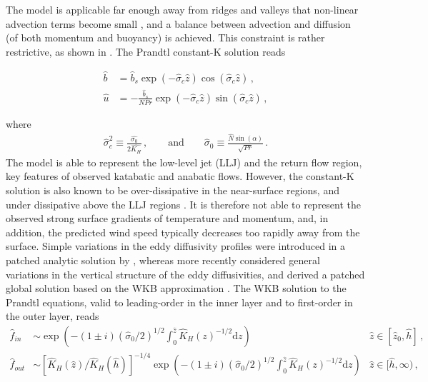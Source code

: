 The model is applicable far enough away from ridges and valleys that non-linear advection terms become small \citep{NAPPO1987}, and a balance between advection and diffusion (of both momentum and buoyancy) is achieved. This constraint is rather restrictive, as shown in \citet{Zardi2015}. 
The Prandtl constant-K solution reads 
%
\begin{linenomath*}
\begin{subequations}
	\label{Prandtl_sol}
	\begin{align}
		\hat{b} & = \hat{b}_s \exp{(-\hat{\sigma}_c \hat{z})} \cos{(\hat{\sigma}_c \hat{z})} \, , \\
		\hat{u} & = -\frac{\hat{b}_s}{N Pr} \exp{(-\hat{\sigma}_c \hat{z})} \sin{(\hat{\sigma}_c \hat{z})} \, ,
	\end{align}
\end{subequations}
\end{linenomath*}
%
where
%
\begin{eqnarray}
	\hat{\sigma}_c^2 \equiv \frac{\hat{\sigma_0}}{2\hat{K_H}} \, , \qquad \mathrm{and} \qquad
	\hat{\sigma}_0 \equiv \frac{\hat{N} \sin{(\alpha)}}{\sqrt{Pr}} \, .
\end{eqnarray}
%
The model is able to represent the low-level jet (LLJ) and the return flow region, key features of observed katabatic and anabatic flows. 
However, the constant-K solution is also known to be over-dissipative in the near-surface regions, and under dissipative above the LLJ regions \citep{Defant1949,Oerlemans1998, grisogono2001katabatic}. It is therefore not able to represent the observed strong surface gradients of temperature and momentum, and, in addition, the predicted wind speed typically decreases too rapidly away from the surface.
Simple variations in the eddy diffusivity profiles were introduced in a patched analytic solution by \citet{gutman_1983}, whereas more recently \citet{grisogono2001katabatic} considered general variations in the vertical structure of the eddy diffusivities, and derived  a patched global solution based on the WKB approximation \citep{Bender1979}.
The WKB solution to the Prandtl equations, valid to leading-order in the inner layer and to first-order in the outer layer, reads
%
\begin{subequations}
	\begin{align}
		\hat{f}_{in} & \sim  \exp{ \left( -(1 \pm i) (\hat{\sigma}_0/2)^{1/2} \int_0^{\hat{z}}{\hat{K}_H(z)^{-1/2}}{\mathrm{d}z}\right)}  &  \hat{z} \in [\hat{z}_0,\hat{h}] \, , \\
		\hat{f}_{out}&  \sim  [ \hat{K}_H(\hat{z}) / \hat{K}_H(\hat{h}) ]^{-1/4} \exp{ \left( -(1 \pm i) (\hat{\sigma}_0/2)^{1/2} \int_0^{\hat{z}}{\hat{K}_H(z)^{-1/2}}{\mathrm{d}z} \right)} & \hat{z} \in [\hat{h},\infty) \, ,
	\end{align}
	\label{WKB_sol}
\end{subequations}
